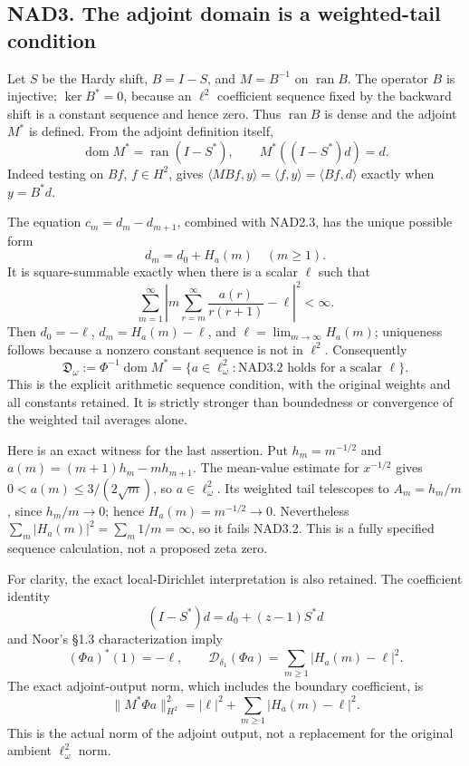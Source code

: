 \subsection{NAD3. The adjoint domain is a weighted-tail
condition}\label{nad3.-the-adjoint-domain-is-a-weighted-tail-condition}

Let \(S\) be the Hardy shift, \(B=I-S\), and \(M=B^{-1}\) on
\(\operatorname{ran}B\). The operator \(B\) is injective;
\(\ker B^*=0\), because an \(\ell^2\) coefficient sequence fixed by the
backward shift is a constant sequence and hence zero. Thus
\(\operatorname{ran}B\) is dense and the adjoint \(M^*\) is defined.
From the adjoint definition itself, \[
 \operatorname{dom}M^*=\operatorname{ran}(I-S^*),\qquad
 M^*((I-S^*)d)=d.
 \tag{NAD3.1}
\] Indeed testing on \(Bf\), \(f\in H^2\), gives
\(\langle MBf,y\rangle=\langle f,y\rangle=\langle Bf,d\rangle\) exactly
when \(y=B^*d\).

The equation \(c_m=d_m-d_{m+1}\), combined with NAD2.3, has the unique
possible form \[
 d_m=d_0+H_a(m)\quad(m\ge1).
\] It is square-summable exactly when there is a scalar \(\ell\) such
that \[
 \boxed{\sum_{m=1}^{\infty}
 \left|m\sum_{r=m}^{\infty}\frac{a(r)}{r(r+1)}-\ell\right|^2<\infty.}
 \tag{NAD3.2}
\] Then \(d_0=-\ell\), \(d_m=H_a(m)-\ell\), and
\(\ell=\lim_{m\to\infty}H_a(m)\); uniqueness follows because a nonzero
constant sequence is not in \(\ell^2\). Consequently \[
 \mathfrak D_\omega:=\Phi^{-1}\operatorname{dom}M^*
 =\{a\in\ell^2_\omega:\text{NAD3.2 holds for a scalar }\ell\}.
 \tag{NAD3.3}
\] This is the explicit arithmetic sequence condition, with the original
weights and all constants retained. It is strictly stronger than
boundedness or convergence of the weighted tail averages alone.

Here is an exact witness for the last assertion. Put \(h_m=m^{-1/2}\)
and \(a(m)=(m+1)h_m-mh_{m+1}\). The mean-value estimate for \(x^{-1/2}\)
gives \(0<a(m)\le3/(2\sqrt m)\), so \(a\in\ell^2_\omega\). Its weighted
tail telescopes to \(A_m=h_m/m\), since \(h_m/m\to0\); hence
\(H_a(m)=m^{-1/2}\to0\). Nevertheless
\(\sum_m|H_a(m)|^2=\sum_m1/m=\infty\), so it fails NAD3.2. This is a
fully specified sequence calculation, not a proposed zeta zero.

For clarity, the exact local-Dirichlet interpretation is also retained.
The coefficient identity \[
 (I-S^*)d=d_0+(z-1)S^*d
\] and Noor's §1.3 characterization imply \[
 (\Phi a)^*(1)=-\ell,
 \qquad \mathcal D_{\delta_1}(\Phi a)=
 \sum_{m\ge1}|H_a(m)-\ell|^2.
 \tag{NAD3.4}
\] The exact adjoint-output norm, which includes the boundary
coefficient, is \[
 \boxed{\|M^*\Phi a\|_{H^2}^2
 =|\ell|^2+\sum_{m\ge1}|H_a(m)-\ell|^2.}
 \tag{NAD3.5}
\] This is the actual norm of the adjoint output, not a replacement for
the original ambient \(\ell^2_\omega\) norm.

